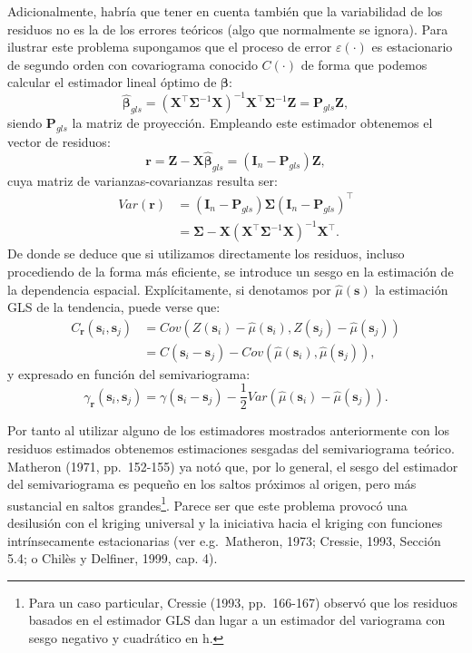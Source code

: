 \documentclass[
  spanish,
]{book}
\theoremstyle{break}
\theoremstyle{definition}
\theoremstyle{definition}
\theoremstyle{definition}
\theoremstyle{definition}
\theoremstyle{remark}
\begin{document}
Adicionalmente, habría que tener en cuenta también que la variabilidad de los residuos no es la de los errores teóricos (algo que normalmente se ignora).
Para ilustrar este problema supongamos que el proceso de error \(\varepsilon(\cdot)\) es estacionario de segundo orden con covariograma conocido \(C(\cdot)\) de forma que podemos calcular el estimador lineal óptimo de \(\boldsymbol{\beta}\):
\[\hat{\boldsymbol{\beta}}_{gls} =(\mathbf{X}^{\top}\boldsymbol{\Sigma}^{-1} \mathbf{X})^{-1} \mathbf{X}^{\top}\boldsymbol{\Sigma}^{-1} \mathbf{Z} = \mathbf{P}_{gls}\mathbf{Z},\]
siendo \(\mathbf{P}_{gls}\) la matriz de proyección.
Empleando este estimador obtenemos el vector de residuos:
\[\mathbf{r} =\mathbf{Z}-\mathbf{X}\hat{\boldsymbol{\beta}}_{gls} =\left( \mathbf{I}_{n} - \mathbf{P}_{gls} \right)\mathbf{Z},\]
cuya matriz de varianzas-covarianzas resulta ser:
\[\begin{aligned}
Var(\mathbf{r}) &=(\mathbf{I}_{n} -\mathbf{P}_{gls})\boldsymbol{\Sigma}(\mathbf{I}_{n}
-\mathbf{P}_{gls})^\top  \\
& = \boldsymbol{\Sigma} - \mathbf{X}(\mathbf{X}^\top\boldsymbol{\Sigma}^{-1} \mathbf{X})^{-1}
\mathbf{X}^\top.
\end{aligned}\]
De donde se deduce que si utilizamos directamente los residuos, incluso procediendo de la forma más eficiente, se introduce un sesgo en la estimación de la dependencia espacial.
Explícitamente, si denotamos por \(\hat{\mu}(\mathbf{s})\) la estimación GLS de la tendencia, puede verse que:
\[\begin{aligned}
C_{\mathbf{r}}(\mathbf{s}_{i} ,\mathbf{s}_{j}) &= Cov\left(Z(\mathbf{s}_{i})-\hat{\mu}(\mathbf{s}_{i}), Z(\mathbf{s}_{j} ) - \hat{\mu}(\mathbf{s}_{j})\right) \\
&= C(\mathbf{s}_{i} -\mathbf{s}_{j}) - Cov(\hat{\mu}(\mathbf{s}_{i} ), \hat{\mu}(\mathbf{s}_{j})),
\end{aligned}\]
y expresado en función del semivariograma:
\[\gamma_{\mathbf{r}}(\mathbf{s}_{i} ,\mathbf{s}_{j}) = \gamma
(\mathbf{s}_{i} -\mathbf{s}_{j})-\frac{1}{2} Var(\hat{\mu}
(\mathbf{s}_{i})-\hat{\mu}(\mathbf{s}_{j})).\]

Por tanto al utilizar alguno de los estimadores mostrados anteriormente con los residuos estimados obtenemos estimaciones sesgadas del semivariograma teórico.
Matheron (1971, pp.~152-155) ya notó que, por lo general, el sesgo del estimador del semivariograma es pequeño en los saltos próximos al origen, pero más sustancial en saltos grandes\footnote{Para un caso particular, Cressie (1993, pp.~166-167) observó que los residuos basados en el estimador GLS dan lugar a un estimador del variograma con sesgo negativo y cuadrático en h.}.
Parece ser que este problema provocó una desilusión con el kriging universal y la iniciativa hacia el kriging con funciones intrínsecamente estacionarias (ver e.g.~Matheron, 1973; Cressie, 1993, Sección 5.4; o Chilès y Delfiner, 1999, cap. 4).
\end{document}
